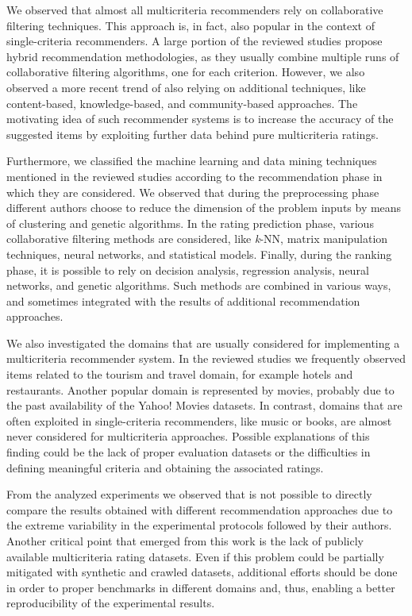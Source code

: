 We observed that almost all multicriteria recommenders rely on collaborative filtering techniques. This approach is, in fact, also popular in the context of single-criteria recommenders. A large portion of the reviewed studies propose hybrid recommendation methodologies, as they usually combine multiple runs of collaborative filtering algorithms, one for each criterion. However, we also observed a more recent trend of also relying on additional techniques, like content-based, knowledge-based, and community-based approaches. The motivating idea of such recommender systems is to increase the accuracy of the suggested items by exploiting further data behind pure multicriteria ratings.

Furthermore, we classified the machine learning and data mining techniques mentioned in the reviewed studies according to the recommendation phase in which they are considered. We observed that during the preprocessing phase different authors choose to reduce the dimension of the problem inputs by means of clustering and genetic algorithms. In the rating prediction phase, various collaborative filtering methods are considered, like \textit{k}-NN, matrix manipulation techniques, neural networks, and statistical models. Finally, during the ranking phase, it is possible to rely on decision analysis, regression analysis, neural networks, and genetic algorithms. Such methods are combined in various ways, and sometimes integrated with the results of additional recommendation approaches.

We also investigated the domains that are usually considered for implementing a multicriteria recommender system. In the reviewed studies we frequently observed items related to the tourism and travel domain, for example hotels and restaurants. Another popular domain is represented by movies, probably due to the past availability of the Yahoo! Movies datasets. In contrast, domains that are often exploited in single-criteria recommenders, like music or books, are almost never considered for multicriteria approaches. Possible explanations of this finding could be the lack of proper evaluation datasets or the difficulties in defining meaningful criteria and obtaining the associated ratings.

From the analyzed experiments we observed that  is not possible to directly compare the results obtained with different recommendation approaches due to the extreme variability in the experimental protocols followed by their authors. Another critical point that emerged from this work is the lack of publicly available multicriteria rating datasets. Even if this problem could be partially mitigated with synthetic and crawled datasets, additional efforts should be done in order to  proper benchmarks in different domains and, thus, enabling a better reproducibility of the experimental results.

